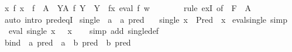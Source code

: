 \begin{isabellebody}
\ {\isachardoublequoteopen}{\isasymexists}x{\isachardot}{\kern0pt}\ {\isacharparenleft}{\kern0pt}{\isasymexists}f{\isachardot}{\kern0pt}\ x\ {\isacharequal}{\kern0pt}\ f\ {\isacharbackquote}{\kern0pt}\ A\ {\isasymand}\ {\isacharparenleft}{\kern0pt}{\isasymforall}Y{\isasymin}A{\isachardot}{\kern0pt}\ f\ Y\ {\isasymin}\ Y{\isacharparenright}{\kern0pt}{\isacharparenright}{\kern0pt}\ {\isasymand}\ {\isacharparenleft}{\kern0pt}{\isasymforall}f{\isasymin}x{\isachardot}{\kern0pt}\ eval\ f\ w{\isacharparenright}{\kern0pt}{\isachardoublequoteclose}\isanewline
\ \ \ \ \ \ \isamarkupfalse%
\ {\isacharparenleft}{\kern0pt}rule\ exI\ {\isacharbrackleft}{\kern0pt}of\ {\isacharunderscore}{\kern0pt}\ {\isachardoublequoteopen}F\ {\isacharbackquote}{\kern0pt}\ A{\isachardoublequoteclose}{\isacharbrackright}{\kern0pt}{\isacharparenright}{\kern0pt}\isanewline
\ \ \isamarkupfalse%
\isanewline
{}\isamarkupfalse%
\ {\isacharparenleft}{\kern0pt}auto\ intro{\isacharbang}{\kern0pt}{\isacharcolon}{\kern0pt}\ pred{\isacharunderscore}{\kern0pt}eqI{\isacharparenright}{\kern0pt}%
\endisatagproof
{\isafoldproof}%
%
\isadelimproof
%
\endisadelimproof
\isanewline
\isanewline
{}\isamarkupfalse%
\isanewline
\isanewline
{}\isamarkupfalse%
\ single\ {\isacharcolon}{\kern0pt}{\isacharcolon}{\kern0pt}\ {\isachardoublequoteopen}{\isacharprime}{\kern0pt}a\ {\isasymRightarrow}\ {\isacharprime}{\kern0pt}a\ pred{\isachardoublequoteclose}\ \isanewline
\ \ {\isachardoublequoteopen}single\ x\ {\isacharequal}{\kern0pt}\ Pred\ {\isacharparenleft}{\kern0pt}{\isacharparenleft}{\kern0pt}{\isacharequal}{\kern0pt}{\isacharparenright}{\kern0pt}\ x{\isacharparenright}{\kern0pt}{\isachardoublequoteclose}\isanewline
\isanewline
{}\isamarkupfalse%
\ eval{\isacharunderscore}{\kern0pt}single\ {\isacharbrackleft}{\kern0pt}simp{\isacharbrackright}{\kern0pt}{\isacharcolon}{\kern0pt}\isanewline
\ \ {\isachardoublequoteopen}eval\ {\isacharparenleft}{\kern0pt}single\ x{\isacharparenright}{\kern0pt}\ {\isacharequal}{\kern0pt}\ {\isacharparenleft}{\kern0pt}{\isacharequal}{\kern0pt}{\isacharparenright}{\kern0pt}\ x{\isachardoublequoteclose}\isanewline
%
\isadelimproof
\ \ %
\endisadelimproof
%
\isatagproof
{}\isamarkupfalse%
\ {\isacharparenleft}{\kern0pt}simp\ add{\isacharcolon}{\kern0pt}\ single{\isacharunderscore}{\kern0pt}def{\isacharparenright}{\kern0pt}%
\endisatagproof
{\isafoldproof}%
%
\isadelimproof
\isanewline
%
\endisadelimproof
\isanewline
{}\isamarkupfalse%
\ bind\ {\isacharcolon}{\kern0pt}{\isacharcolon}{\kern0pt}\ {\isachardoublequoteopen}{\isacharprime}{\kern0pt}a\ pred\ {\isasymRightarrow}\ {\isacharparenleft}{\kern0pt}{\isacharprime}{\kern0pt}a\ {\isasymRightarrow}\ {\isacharprime}{\kern0pt}b\ pred{\isacharparenright}{\kern0pt}\ {\isasymRightarrow}\ {\isacharprime}{\kern0pt}b\ pred{\isachardoublequoteclose}\ {\isacharparenleft}{\kern0pt}\ {\isachardoublequoteopen}{\isasymbind}{\isachardoublequoteclose}\ {}{}{\isacharparenright}{\kern0pt}\ \isanewline

\end{isabellebody}
